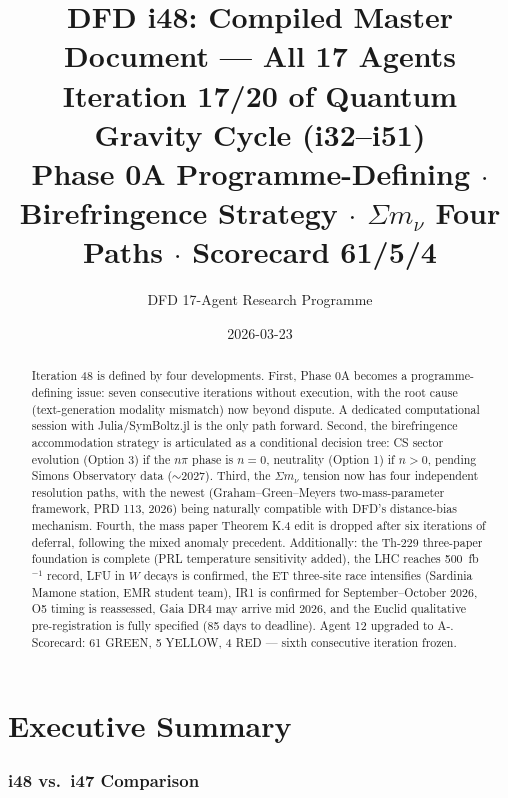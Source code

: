 \documentclass[11pt,a4paper]{article}
\title{DFD i48: Compiled Master Document --- All 17 Agents\\[6pt]
\large Iteration 17/20 of Quantum Gravity Cycle (i32--i51)\\[6pt]
\normalsize Phase 0A Programme-Defining $\cdot$ Birefringence Strategy $\cdot$ $\Sigma m_\nu$ Four Paths $\cdot$ Scorecard 61/5/4}
\author{DFD 17-Agent Research Programme}
\date{2026-03-23}
\begin{document}
\maketitle

\begin{abstract}
Iteration 48 is defined by four developments. First, Phase 0A becomes a programme-defining issue: seven consecutive iterations without execution, with the root cause (text-generation modality mismatch) now beyond dispute. A dedicated computational session with Julia/SymBoltz.jl is the only path forward. Second, the birefringence accommodation strategy is articulated as a conditional decision tree: CS sector evolution (Option 3) if the $n\pi$ phase is $n = 0$, neutrality (Option 1) if $n > 0$, pending Simons Observatory data ($\sim$2027). Third, the $\Sigma m_\nu$ tension now has four independent resolution paths, with the newest (Graham--Green--Meyers two-mass-parameter framework, PRD 113, 2026) being naturally compatible with DFD's distance-bias mechanism. Fourth, the mass paper Theorem K.4 edit is dropped after six iterations of deferral, following the mixed anomaly precedent. Additionally: the Th-229 three-paper foundation is complete (PRL temperature sensitivity added), the LHC reaches 500~fb$^{-1}$ record, LFU in $W$ decays is confirmed, the ET three-site race intensifies (Sardinia Mamone station, EMR student team), IR1 is confirmed for September--October 2026, O5 timing is reassessed, Gaia DR4 may arrive mid 2026, and the Euclid qualitative pre-registration is fully specified (85 days to deadline). Agent 12 upgraded to A-. Scorecard: 61 GREEN, 5 YELLOW, 4 RED --- sixth consecutive iteration frozen.
\end{abstract}

\tableofcontents
\newpage

\part{Executive Summary}

\section{i48 vs.\ i47 Comparison}
\end{document}
